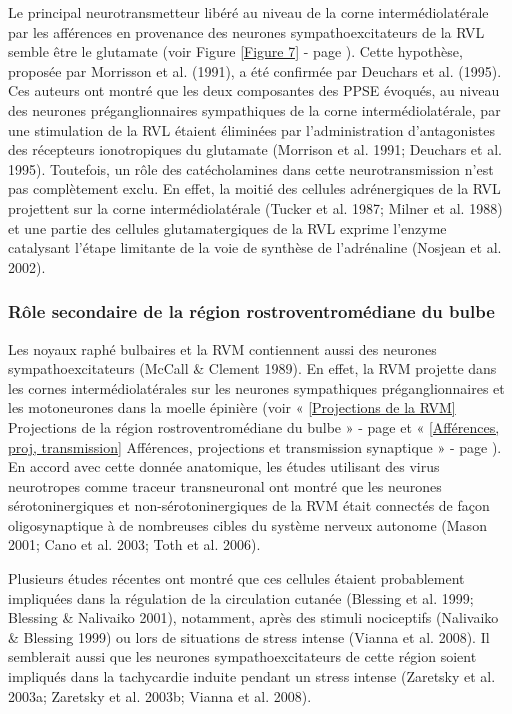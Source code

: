 \documentclass[a4paper,12pt,twoside]{report}
\begin{document}
Le principal neurotransmetteur libéré au niveau de la corne intermédiolatérale par les afférences en provenance des neurones sympathoexcitateurs de la RVL semble être le glutamate (voir Figure \ref{Figure 7} - page \pageref{Figure 7}). Cette hypothèse, proposée par Morrisson et al. (1991), a été confirmée par Deuchars et al. (1995). Ces auteurs ont montré que les deux composantes des PPSE évoqués, au niveau des neurones préganglionnaires sympathiques de la corne intermédiolatérale, par une stimulation de la RVL étaient éliminées par l’administration d’antagonistes des récepteurs ionotropiques du glutamate (Morrison et al. 1991; Deuchars et al. 1995). Toutefois, un rôle des catécholamines dans cette neurotransmission n’est pas complètement exclu. En effet, la moitié des cellules adrénergiques de la RVL projettent sur la corne intermédiolatérale (Tucker et al. 1987; Milner et al. 1988) et une partie des cellules glutamatergiques de la RVL exprime l’enzyme catalysant l’étape limitante de la voie de synthèse de l’adrénaline (Nosjean et al. 2002).

\subsubsection{Rôle secondaire de la région rostroventromédiane du bulbe}

Les noyaux raphé bulbaires et la RVM contiennent aussi des neurones sympathoexcitateurs (McCall \& Clement 1989). En effet, la RVM projette dans les cornes intermédiolatérales sur les neurones sympathiques préganglionnaires et les motoneurones dans la moelle épinière (voir « \ref{Projections de la RVM} Projections de la région rostroventromédiane du bulbe » - page \pageref{Projections de la RVM} et « \ref{Afférences, proj, transmission} Afférences, projections et transmission synaptique » - page \pageref{Afférences, proj, transmission}). En accord avec cette donnée anatomique, les études utilisant des virus neurotropes comme traceur transneuronal ont montré que les neurones sérotoninergiques et non-sérotoninergiques de la RVM était connectés de façon oligosynaptique à de nombreuses cibles du système nerveux autonome (Mason 2001; Cano et al. 2003; Toth et al. 2006).

Plusieurs études récentes ont montré que ces cellules étaient probablement impliquées dans la régulation de la circulation cutanée (Blessing et al. 1999; Blessing \& Nalivaiko 2001), notamment, après des stimuli nociceptifs (Nalivaiko \& Blessing 1999) ou lors de situations de stress intense (Vianna et al. 2008). Il semblerait aussi que les neurones sympathoexcitateurs de cette région soient impliqués dans la tachycardie induite pendant un stress intense (Zaretsky et al. 2003a; Zaretsky et al. 2003b; Vianna et al. 2008).
\end{document}
